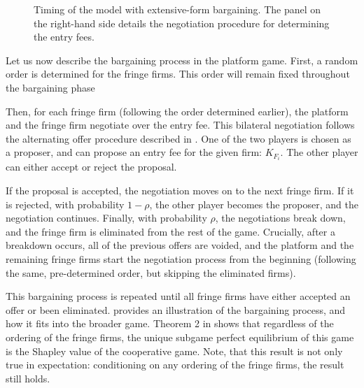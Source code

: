 \documentclass[a4paper]{article}
\begin{document}
\begin{figure}
    \caption{Timing of the model with extensive-form bargaining. The panel on the right-hand side details the negotiation procedure for determining the entry fees.}
    \label{fig:bargaining_microfoundations}
\end{figure}

Let us now describe the bargaining process in the platform game.
First, a random order is determined for the fringe firms.
This order will remain fixed throughout the bargaining phase

Then, for each fringe firm (following the order determined earlier), the platform and the fringe firm negotiate over the entry fee.
This bilateral negotiation follows the alternating offer procedure described in \textcite{binmore1986nash}.
One of the two players is chosen as a proposer, and can propose an entry fee for the given firm: $K_{F_i}$.
The other player can either accept or reject the proposal.

If the proposal is accepted, the negotiation moves on to the next fringe firm.
If it is rejected, with probability $1-\rho$, the other player becomes the proposer, and the negotiation continues.
Finally, with probability $\rho$, the negotiations break down, and the fringe firm is eliminated from the rest of the game.
Crucially, after a breakdown occurs, all of the previous offers are voided, and the platform and the remaining fringe firms start the negotiation process from the beginning (following the same, pre-determined order, but skipping the eliminated firms).

This bargaining process is repeated until all fringe firms have either accepted an offer or been eliminated.
 provides an illustration of the bargaining process, and how it fits into the broader game.
Theorem 2 in \textcite{stole1996intra} shows that regardless of the ordering of the fringe firms, the unique subgame perfect equilibrium of this game is the Shapley value of the cooperative game.
Note, that this result is not only true in expectation: conditioning on any ordering of the fringe firms, the result still holds.
\end{document}
